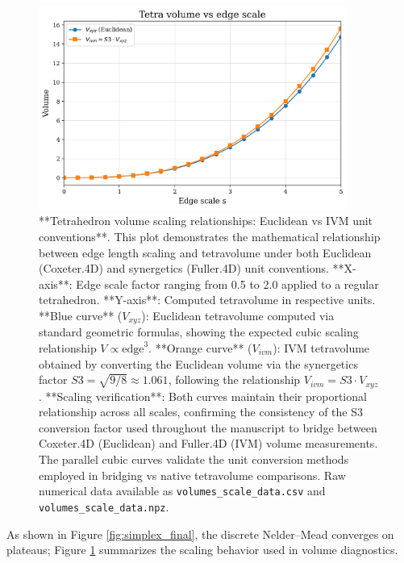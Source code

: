 \documentclass[
  10pt,
]{article}
\begin{document}
\begin{figure}[htbp]
\centering
\includegraphics[width=0.9\textwidth]{figures/volumes_scale_plot.png}
\caption{**Tetrahedron volume scaling relationships: Euclidean vs IVM unit conventions**. This plot demonstrates the mathematical relationship between edge length scaling and tetravolume under both Euclidean (Coxeter.4D) and synergetics (Fuller.4D) unit conventions. **X-axis**: Edge scale factor ranging from 0.5 to 2.0 applied to a regular tetrahedron. **Y-axis**: Computed tetravolume in respective units. **Blue curve** ($V_{xyz}$): Euclidean tetravolume computed via standard geometric formulas, showing the expected cubic scaling relationship $V \propto \text{edge}^3$. **Orange curve** ($V_{ivm}$): IVM tetravolume obtained by converting the Euclidean volume via the synergetics factor $S3 = \sqrt{9/8} \approx 1.061$, following the relationship $V_{ivm} = S3 \cdot V_{xyz}$. **Scaling verification**: Both curves maintain their proportional relationship across all scales, confirming the consistency of the S3 conversion factor used throughout the manuscript to bridge between Coxeter.4D (Euclidean) and Fuller.4D (IVM) volume measurements. The parallel cubic curves validate the unit conversion methods employed in bridging vs native tetravolume comparisons. Raw numerical data available as \texttt{volumes\_scale\_data.csv} and \texttt{volumes\_scale\_data.npz}.}
\label{fig:volumes_scale}
\end{figure}

As shown in Figure \ref{fig:simplex_final}, the discrete Nelder--Mead
converges on plateaus; Figure \ref{fig:volumes_scale} summarizes the
scaling behavior used in volume diagnostics.
\end{document}
